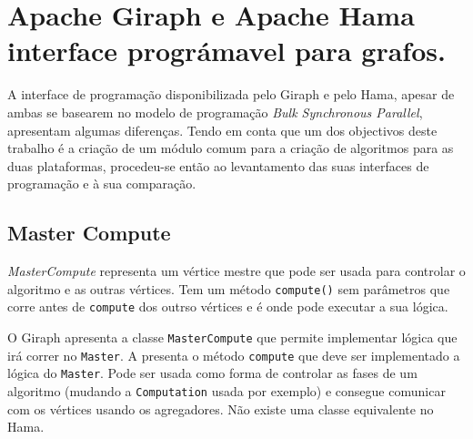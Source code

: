 \chapter{Apache Giraph e Apache Hama interface prográmavel para grafos.}

A interface de programação disponibilizada pelo Giraph e pelo Hama, apesar de ambas se basearem no modelo de programação \textit{Bulk Synchronous Parallel}, apresentam algumas diferenças. Tendo em conta que um dos objectivos deste trabalho é a criação de um módulo comum para a criação de algoritmos para as duas plataformas, procedeu-se então ao levantamento das suas interfaces de programação e à sua comparação. 

\section{Master Compute}
\textit{MasterCompute} representa um vértice mestre que pode ser usada para controlar o algoritmo e as outras vértices. Tem um método \texttt{compute()} sem parâmetros que corre antes de \texttt{compute} dos outrso vértices e é onde pode executar a sua lógica.


O Giraph apresenta a classe \texttt{MasterCompute} que permite implementar lógica que irá correr no \texttt{Master}. A presenta o método \texttt{compute} que deve ser implementado a lógica do \texttt{Master}. Pode ser usada como forma de controlar as fases de um algoritmo (mudando a \texttt{Computation} usada por exemplo) e consegue comunicar com os vértices usando os agregadores. Não existe uma classe equivalente no Hama.












